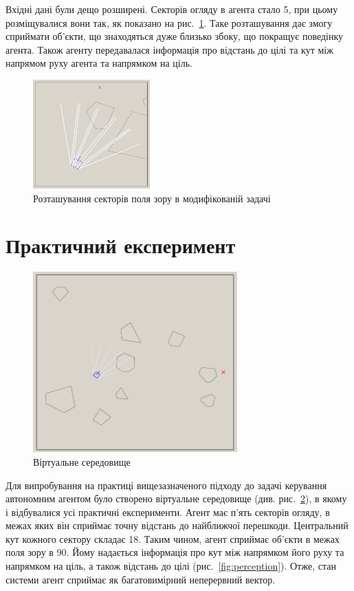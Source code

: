 \documentclass[a4paper,10pt,fleqn]{article}
\begin{document}
Вхідні дані були дещо розширені. Секторів огляду в агента стало 5, при цьому розміщувалися вони так, як показано на рис.~\ref{fig:tank-vis-area}. Таке розташування дає змогу сприймати об'єкти, що знаходяться дуже близько збоку, що покращує поведінку агента. Також агенту передавалася інформація про відстань до цілі та кут між напрямом руху агента та напрямком на ціль.
\begin{figure}
	\centering
	\includegraphics[width=0.4\textwidth]{tank-vis-area}
	\caption{Розташування секторів поля зору в модифікованій задачі}
	\label{fig:tank-vis-area}
\end{figure}

\section{Практичний експеримент}

\begin{figure}
	\centering
    \includegraphics[width=0.7\textwidth]{env-screen.png}
	\caption{Віртуальне середовище}
	\label{fig:environment}
\end{figure}

Для випробування на практиці вищезазначеного підходу до задачі керування автономним агентом було створено віртуальне середовище (див. рис.~\ref{fig:environment}), в якому і відбувалися усі практичні експерименти. Агент має п'ять секторів огляду, в межах яких він сприймає точну відстань до найближчої перешкоди. Центральний кут кожного сектору складає 18\textdegree. Таким чином, агент сприймає об'єкти в межах поля зору в 90\textdegree. Йому надається інформація про кут між напрямком його руху та напрямком на ціль, а також відстань до цілі (рис.~\ref{fig:perception}). Отже, стан системи агент сприймає як багатовимірний неперервний вектор.
\end{document}
